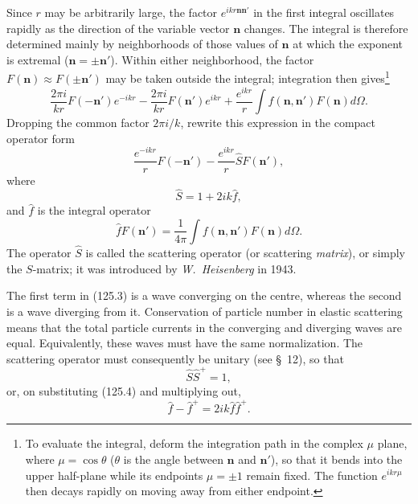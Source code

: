 Since $r$ may be arbitrarily large, the factor
$e^{ikr\mathbf n\mathbf n'}$ in the first integral oscillates rapidly as the
direction of the variable vector $\mathbf n$ changes. The integral is
therefore determined mainly by neighborhoods of those values of $\mathbf n$
at which the exponent is extremal ($\mathbf n=\pm\mathbf n'$). Within either
neighborhood, the factor $F(\mathbf n)\approx F(\pm\mathbf n')$ may be taken
outside the integral; integration then gives\footnote{To evaluate the
integral, deform the integration path in the complex $\mu$ plane, where
$\mu=\cos\theta$ ($\theta$ is the angle between $\mathbf n$ and
$\mathbf n'$), so that it bends into the upper half-plane while its endpoints
$\mu=\pm1$ remain fixed. The function $e^{ikr\mu}$ then decays rapidly on
moving away from either endpoint.}
\[
 \frac{2\pi i}{kr}F(-\mathbf n')e^{-ikr}
 -\frac{2\pi i}{kr}F(\mathbf n')e^{ikr}
 +\frac{e^{ikr}}r\int f(\mathbf n,\mathbf n')F(\mathbf n)d\Omega.
\]
Dropping the common factor $2\pi i/k$, rewrite this expression in the compact
operator form
\begin{equation}
 \frac{e^{-ikr}}rF(-\mathbf n')-\frac{e^{ikr}}r\hat S F(\mathbf n'),
 \tag{125.3}
\end{equation}
where
\begin{equation}
 \hat S=1+2ik\hat f,
 \tag{125.4}
\end{equation}
and $\hat f$ is the integral operator
\begin{equation}
 \hat fF(\mathbf n')=\frac1{4\pi}\int
 f(\mathbf n,\mathbf n')F(\mathbf n)d\Omega.
 \tag{125.5}
\end{equation}
The operator $\hat S$ is called the scattering operator (or scattering
\emph{matrix}), or simply the $S$-matrix; it was introduced by
\emph{W.~Heisenberg} in 1943.

The first term in (125.3) is a wave converging on the centre, whereas the
second is a wave diverging from it. Conservation of particle number in
elastic scattering means that the total particle currents in the converging
and diverging waves are equal. Equivalently, these waves must have the same
normalization. The scattering operator must consequently be unitary (see
\S~12), so that
\begin{equation}
 \hat S\hat S^+=1,
 \tag{125.6}
\end{equation}
or, on substituting (125.4) and multiplying out,
\begin{equation}
 \hat f-\hat f^+=2ik\hat f\hat f^+.
 \tag{125.7}
\end{equation}

